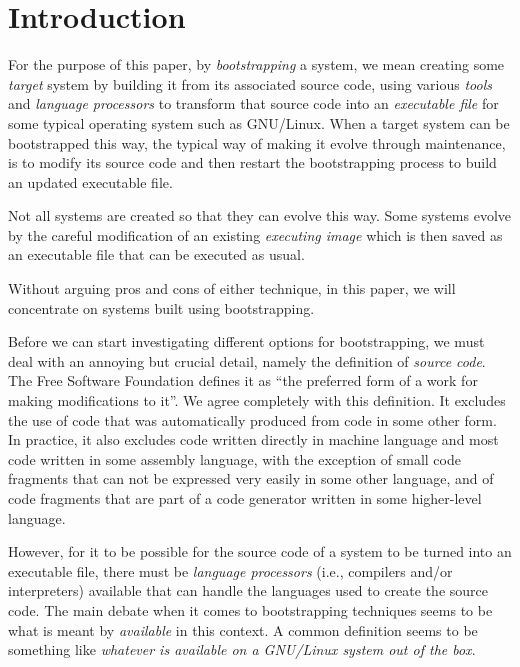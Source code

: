 \section{Introduction}
\label{sec-introduction}

For the purpose of this paper, by \emph{bootstrapping} a \commonlisp{}
system, we mean creating some \emph{target} \commonlisp{} system by
building it from its associated source code, using various
\emph{tools} and \emph{language processors} to transform that source
code into an \emph{executable file} for some typical operating system
such as GNU/Linux.  When a target \commonlisp{} system can be
bootstrapped this way, the typical way of making it evolve through
maintenance, is to modify its source code and then restart the
bootstrapping process to build an updated executable file.

Not all \commonlisp{} systems are created so that they can evolve this
way.  Some systems evolve by the careful modification of an existing
\emph{executing image} which is then saved as an executable file that
can be executed as usual.

Without arguing pros and cons of either technique, in this paper, we
will concentrate on systems built using bootstrapping.

Before we can start investigating different options for bootstrapping,
we must deal with an annoying but crucial detail, namely the
definition of \emph{source code}.  The Free Software Foundation
defines it as ``the preferred form of a work for making modifications
to it''.  We agree completely with this definition.  It excludes the
use of code that was automatically produced from code in some other
form.  In practice, it also excludes code written directly in machine
language and most code written in some assembly language, with the
exception of small code fragments that can not be expressed very
easily in some other language, and of code fragments that are part of
a code generator written in some higher-level language.

However, for it to be possible for the source code of a \commonlisp{}
system to be turned into an executable file, there must be
\emph{language processors} (i.e., compilers and/or interpreters)
available that can handle the languages used to create the source
code.  The main debate when it comes to bootstrapping techniques seems
to be what is meant by \emph{available} in this context.  A common
definition seems to be something like \emph{whatever is available on a
  GNU/Linux system out of the box}.

